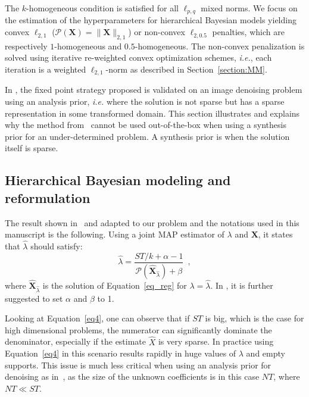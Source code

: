 The $k$-homogeneous condition is satisfied for all $\ell_{p,q}$ mixed norms. We focus on the estimation of the hyperparameters for hierarchical Bayesian models yielding convex $\ell_{2,1}$ ($\mathcal{P}(\mathbf{X})=\|\mathbf{X}\|_{2,1}$) or non-convex $\ell_{2,0.5}$ penalties, which are respectively $1$-homogeneous and $0.5$-homogeneous. The non-convex penalization is solved using iterative re-weighted convex optimization schemes, \textit{i.e.}, each iteration is a weighted $\ell_{2,1}$-norm as described in Section~\ref{section:MM}.

In \cite{Figueiredo}, the fixed point strategy proposed is validated on an image denoising problem using an analysis prior, \textit{i.e.} where the solution is not sparse but has a sparse representation in some transformed domain. This section illustrates and explains why the method from~\cite{Figueiredo} cannot be used out-of-the-box when using a synthesis prior for an under-determined problem. A synthesis prior is when the solution itself is sparse.

\subsection{Hierarchical Bayesian modeling and reformulation}


The result shown in~\cite{Figueiredo} and adapted to our problem and the notations used in this manuscript is the following. Using a joint MAP estimator of $\lambda$ and $\mathbf{X}$, it states that $\hat{\lambda}$ should satisfy:
\begin{equation} \label{eq4}
	\hat{\lambda} = \frac{ST/k + \alpha - 1}{\mathcal{P}(\mathbf{\hat{X}}_{\hat{\lambda}}) + \beta} \enspace ,
\end{equation}
where $\mathbf{\hat{X}}_{\hat{\lambda}}$ is the solution of Equation~\eqref{eq_reg} for $\lambda = \hat{\lambda}$. In \cite{Figueiredo}, it is further suggested to set $\alpha$ and $\beta$ to 1.

Looking at Equation~\eqref{eq4}, one can observe that if $ST$ is big, which is the case for high dimensional problems, the numerator can significantly dominate the denominator, especially if the estimate $\hat{X}$ is very sparse.
In practice using Equation~\eqref{eq4} in this scenario results rapidly in huge values of $\lambda$ and empty supports. This issue is much less critical when using an analysis prior for denoising as in~\cite{Figueiredo}, as the size of the unknown coefficients is in this case $NT$, where $NT \ll ST$.\\

